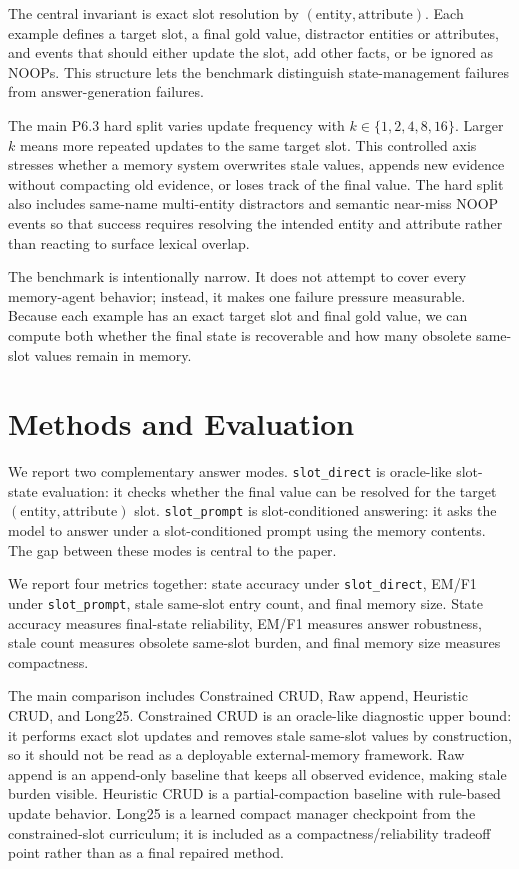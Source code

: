 \documentclass[11pt]{article}
\begin{document}
The central invariant is exact slot resolution by \((\mathrm{entity}, \mathrm{attribute})\). Each example defines a target slot, a final gold value, distractor entities or attributes, and events that should either update the slot, add other facts, or be ignored as NOOPs. This structure lets the benchmark distinguish state-management failures from answer-generation failures.

The main P6.3 hard split varies update frequency with \(k \in \{1,2,4,8,16\}\). Larger \(k\) means more repeated updates to the same target slot. This controlled axis stresses whether a memory system overwrites stale values, appends new evidence without compacting old evidence, or loses track of the final value. The hard split also includes same-name multi-entity distractors and semantic near-miss NOOP events so that success requires resolving the intended entity and attribute rather than reacting to surface lexical overlap.

The benchmark is intentionally narrow. It does not attempt to cover every memory-agent behavior; instead, it makes one failure pressure measurable. Because each example has an exact target slot and final gold value, we can compute both whether the final state is recoverable and how many obsolete same-slot values remain in memory.

\section{Methods and Evaluation}

We report two complementary answer modes. \texttt{slot\_direct} is oracle-like slot-state evaluation: it checks whether the final value can be resolved for the target \((\mathrm{entity}, \mathrm{attribute})\) slot. \texttt{slot\_prompt} is slot-conditioned answering: it asks the model to answer under a slot-conditioned prompt using the memory contents. The gap between these modes is central to the paper.

We report four metrics together: state accuracy under \texttt{slot\_direct}, EM/F1 under \texttt{slot\_prompt}, stale same-slot entry count, and final memory size. State accuracy measures final-state reliability, EM/F1 measures answer robustness, stale count measures obsolete same-slot burden, and final memory size measures compactness.

The main comparison includes Constrained CRUD, Raw append, Heuristic CRUD, and Long25. Constrained CRUD is an oracle-like diagnostic upper bound: it performs exact slot updates and removes stale same-slot values by construction, so it should not be read as a deployable external-memory framework. Raw append is an append-only baseline that keeps all observed evidence, making stale burden visible. Heuristic CRUD is a partial-compaction baseline with rule-based update behavior. Long25 is a learned compact manager checkpoint from the constrained-slot curriculum; it is included as a compactness/reliability tradeoff point rather than as a final repaired method.
\end{document}
